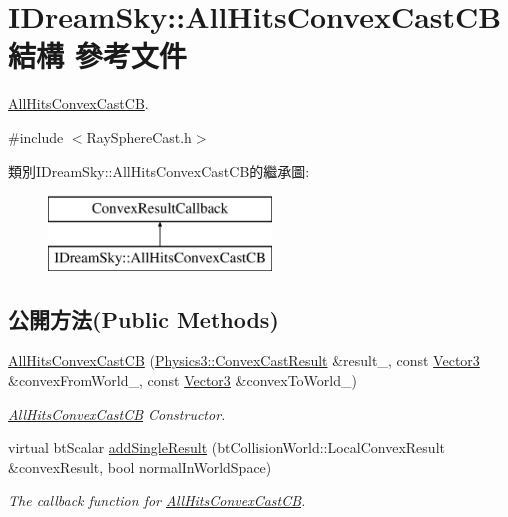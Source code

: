 \hypertarget{struct_i_dream_sky_1_1_all_hits_convex_cast_c_b}{}\section{I\+Dream\+Sky\+:\+:All\+Hits\+Convex\+Cast\+CB 結構 參考文件}
\label{struct_i_dream_sky_1_1_all_hits_convex_cast_c_b}


\hyperlink{struct_i_dream_sky_1_1_all_hits_convex_cast_c_b}{All\+Hits\+Convex\+Cast\+CB}.  




{\ttfamily \#include $<$Ray\+Sphere\+Cast.\+h$>$}

類別\+I\+Dream\+Sky\+:\+:All\+Hits\+Convex\+Cast\+C\+B的繼承圖\+:\begin{figure}[H]
\begin{center}
\leavevmode
\includegraphics[height=2.000000cm]{struct_i_dream_sky_1_1_all_hits_convex_cast_c_b}
\end{center}
\end{figure}
\subsection*{公開方法(Public Methods)}
\begin{DoxyCompactItemize}
\item 
\hyperlink{struct_i_dream_sky_1_1_all_hits_convex_cast_c_b_aadc340575c9a9ac6831787ede1e1bfc0}{All\+Hits\+Convex\+Cast\+CB} (\hyperlink{class_i_dream_sky_1_1_physics3_1_1_convex_cast_result}{Physics3\+::\+Convex\+Cast\+Result} \&result\+\_\+, const \hyperlink{class_i_dream_sky_1_1_vector3}{Vector3} \&convex\+From\+World\+\_\+, const \hyperlink{class_i_dream_sky_1_1_vector3}{Vector3} \&convex\+To\+World\+\_\+)
\begin{DoxyCompactList}\small\item\em \hyperlink{struct_i_dream_sky_1_1_all_hits_convex_cast_c_b}{All\+Hits\+Convex\+Cast\+CB} Constructor. \end{DoxyCompactList}\item 
virtual bt\+Scalar \hyperlink{struct_i_dream_sky_1_1_all_hits_convex_cast_c_b_afe3636b96c602054db9dc0741082bf00}{add\+Single\+Result} (bt\+Collision\+World\+::\+Local\+Convex\+Result \&convex\+Result, bool normal\+In\+World\+Space)
\begin{DoxyCompactList}\small\item\em The callback function for \hyperlink{struct_i_dream_sky_1_1_all_hits_convex_cast_c_b}{All\+Hits\+Convex\+Cast\+CB}. \end{DoxyCompactList}\end{DoxyCompactItemize}
